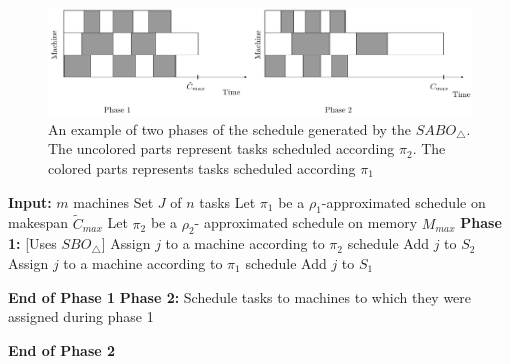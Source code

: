 \documentclass[12pt]{article}
\theoremstyle{mystyle}
\begin{document}
                       \begin{figure}[htp]
                       \centering
                       \includegraphics[width= 16 cm]{mem2.pdf}
                       \caption{An example of two phases of the schedule generated by the $SABO_\triangle$. The uncolored parts  represent tasks scheduled according $\pi_2$. The colored parts represents tasks scheduled according $\pi_1$}
                       \label{fig:ch5-1}
                       \end{figure} 
                         \begin{algorithm}                    
                         \caption{$SABO_\triangle$}
                         \label{alg2}
                          \begin{algorithmic} 
                          \State \textbf{Input:} $m$ machines 
                          \State \hspace*{42pt}Set $J$ of $n$ tasks
                          \State\hspace*{42pt}Let $\pi_1$ be a $ \rho_1$-approximated schedule on makespan $\tilde{C}_{max}$ 
                         \State \hspace*{42pt}Let $\pi_2$ be a $\rho_2$- approximated schedule on memory ${M_{max}}$
                         \State
                          \State \textbf{Phase 1:} [Uses $SBO_\triangle$]
                       \State Assign $j$ to a machine according to $\pi_2$ schedule
                       \State Add $j$ to $S_2$
                       \Else
                       \State Assign $j$ to a machine according to $\pi_1$ schedule
                       \State Add $j$ to $S_1$   
                       \EndIf 
                       \EndFor
                      
                        \State \textbf{End of Phase 1} 
                        \State 
                         \State \textbf{Phase 2:} 
                         \State \hspace*{42pt}Schedule tasks to machines to which they were assigned during phase 1
                            
                         \State \textbf{End of Phase 2} 
                          
                               \end{algorithmic}
                               \end{algorithm}     
           
\end{document}

